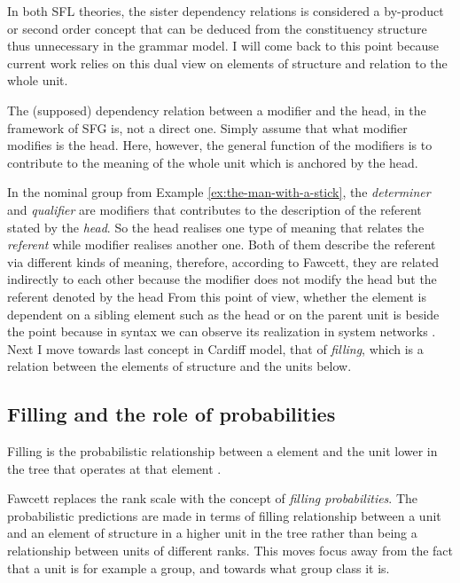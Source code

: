 In both SFL theories, the sister dependency relations is considered a by-product or second order concept that can be deduced from the constituency structure thus unnecessary in the grammar model. I will come back to this point because current work relies on this dual view on elements of structure and relation to the whole unit. 

The (supposed) dependency relation between a modifier and the head, in the framework of SFG is, not a direct one. 
Simply assume that what modifier modifies is the head. Here, however, the general function of the modifiers is to contribute to the meaning of the whole unit which is anchored by the head. 

In the nominal group from Example \ref{ex:the-man-with-a-stick}, the \textit{determiner} and \textit{qualifier} are modifiers that contributes to the description of the referent stated by the \textit{head}. So the head realises one type of meaning that relates the \textit{referent} while modifier realises another one. Both of them describe the referent via different kinds of meaning, therefore, according to Fawcett, they are related indirectly to each other because the modifier does not modify the head but the referent denoted by the head From this point of view, whether the element is dependent on a sibling element such as the head or on the parent unit is beside the point because in syntax we can observe its realization in system networks \citep[216--217]{Fawcett2000}.
Next I move towards last concept in Cardiff model, that of \textit{filling}, which is a relation between the elements of structure and the units below.

\subsection{Filling and the role of probabilities}
\begin{definition}[Filling]\label{def:filling}
    Filling is the probabilistic relationship between a element and the unit lower in the tree that operates at that element \citep[238, 251]{Fawcett2000}. 
\end{definition}

Fawcett replaces the rank scale with the concept of \textit{filling probabilities}. The probabilistic predictions are made in terms of filling relationship between a unit and an element of structure in a higher unit in the tree rather than being a relationship between units of different ranks. This moves focus away from the fact that a unit is for example a group, and towards what group class it is. 

